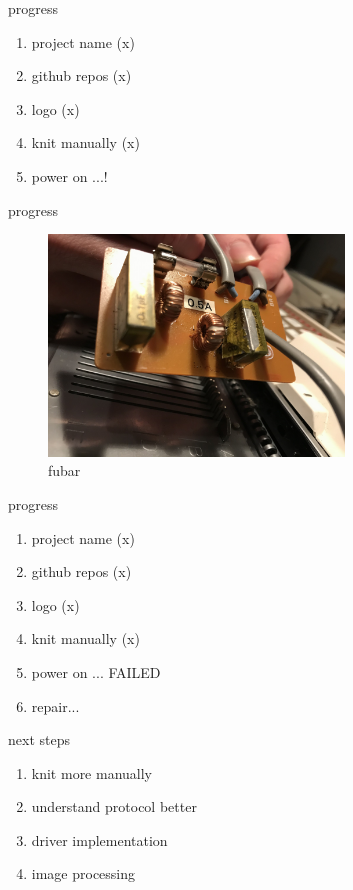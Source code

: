\documentclass{beamer}
\begin{document}
\begin{frame}{progress}
    \begin{enumerate}
        \item project name \pause (x)
        \item github repos \pause (x)
        \item logo \pause (x)
        \item knit manually \pause (x)
        \item power on ...!
    \end{enumerate}
\end{frame}

\begin{frame}{progress}
    \begin{figure}
        \includegraphics[width=0.7\textwidth]{./images/exploded-capacitor.png}
        \caption{fubar}
    \end{figure}
\end{frame}

\begin{frame}{progress}
    \begin{enumerate}
        \item project name (x)
        \item github repos (x)
        \item logo (x)
        \item knit manually (x)
        \item power on ... FAILED\pause
        \item repair...
    \end{enumerate}
\end{frame}


\begin{frame}{next steps}
    \begin{enumerate}
        \item knit more manually
        \item understand protocol better
        \item driver implementation
        \item image processing
    \end{enumerate}
\end{frame}
\end{document}
